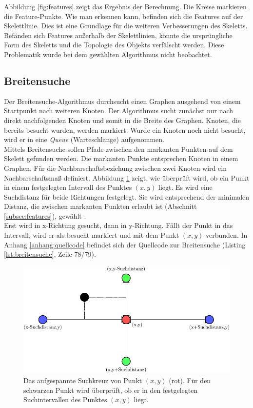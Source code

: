 Abbildung \ref{fig:features} zeigt das Ergebnis der Berechnung. Die Kreise markieren die Feature-Punkte. Wie man erkennen kann, befinden sich die Features auf der Skelettlinie. Dies ist eine Grundlage für die weiteren
Verbesserungen des Skeletts. Befänden sich Features außerhalb der Skelettlinien, könnte die ursprüngliche Form des Skeletts und die Topologie des Objekts verfälscht werden. Diese Problematik wurde bei dem gewählten
Algorithmus \cite{goodfeatures} nicht beobachtet.
\subsection{Breitensuche}
\label{subsec:breitesuche}
Der Breitensuche-Algorithmus durchsucht einen Graphen ausgehend von einem Startpunkt nach weiteren 
Knoten. Der Algorithmus sucht zunächst nur nach direkt nachfolgenden Knoten und somit in die Breite des
Graphen. Knoten, die bereits besucht wurden, werden markiert. Wurde ein Knoten noch nicht besucht, wird er
in eine \emph{Queue} (Warteschlange) aufgenommen.\\
Mittels Breitensuche sollen Pfade zwischen den markanten Punkten auf dem Skelett gefunden werden. Die markanten Punkte entsprechen Knoten in einem Graphen. Für die Nachbarschaftsbeziehung zwischen zwei
Knoten wird ein Nachbarschaftsmaß definiert. Abbildung \ref{fig:suchdistanz_naechster_nachbar} zeigt, wie überprüft wird, ob ein Punkt in einem festgelegten Intervall des Punktes $(x,y)$ liegt. Es wird eine Suchdistanz für beide Richtungen festgelegt. Sie
wird entsprechend der minimalen Distanz, die zwischen markanten Punkten erlaubt ist (Abschnitt \ref{subsec:features}), gewählt . \\
Erst wird in x-Richtung gesucht, dann in y-Richtung. Fällt der Punkt in das Intervall, wird er als besucht markiert und
mit dem Punkt $(x,y)$ verbunden. 
In Anhang \ref{anhang:quellcode} befindet sich der Quellcode zur Breitensuche (Listing \ref{lst:breitensuche}, Zeile 78/79).
\begin{figure}[htbp]
\centering
\includegraphics[width=1.0\linewidth]{./fig/suchdistanz_naechster_nachbar}
\caption{Das aufgespannte Suchkreuz von Punkt $(x,y)$ (rot). Für den schwarzen Punkt wird überprüft, ob er in den festgelegten Suchintervallen des Punktes $(x,y)$ liegt.}
\label{fig:suchdistanz_naechster_nachbar}
\end{figure}\\
